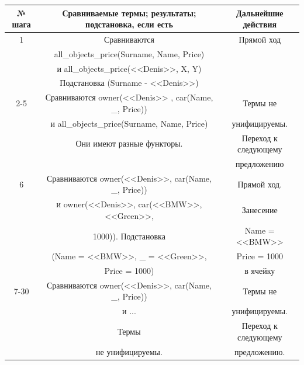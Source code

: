 \documentclass[12pt]{report}
\begin{document}
\begin{table}[H]
	\begin{center}
		\begin{tabular}{|c c c |} 
			\hline
			№ шага & Сравниваемые термы; результаты; подстановка, если есть & Дальнейшие действия \\  
			\hline
			1 & Сравниваются & Прямой ход \\
			  & all\_objects\_price(Surname, Name, Price) & \\
			  & и all\_objects\_price(<<Denis>>, X, Y)  & \\
			  & Подстановка (Surname - <<Denis>>) &\\
			\hline
			2-5 & Сравниваются owner(<<Denis>> , car(Name, \_, Price)) & Термы не \\
			  & и all\_objects\_price(Surname, Name, Price) & унифицируемы. \\
			  & Они имеют разные функторы. &Переход к следующему \\
			  & & предложению\\		
			\hline
			6 & Сравниваются  owner(<<Denis>>, car(Name, \_, Price)) & Прямой ход. \\
			  & и owner(<<Denis>>, car(<<BMW>>, <<Green>>,  & Занесение \\
			  & 1000)). Подстановка & Name = <<BMW>>{} \\
			  & (Name = <<BMW>>, \_ = <<Green>>{}, & Price = 1000\\
			  & Price = 1000) & в ячейку\\
			\hline
			7-30 & Сравниваются owner(<<Denis>>, car(Name, \_, Price)) & Термы не \\
			  & и ... & унифицируемы. \\
		      &  Термы   & Переход к следующему \\
			  & не унифицируемы. & предложению. \\
			

\end{tabular}
\end{center}
\end{table}
\end{document}
